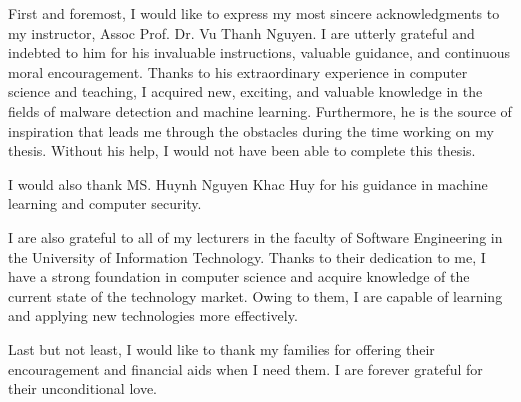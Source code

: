 
\begin{acknowledgements}      

First and foremost, I would like to express my most sincere acknowledgments to my instructor, Assoc Prof. Dr.  Vu Thanh Nguyen. I are utterly grateful and indebted to him for his invaluable instructions, valuable guidance, and continuous moral encouragement. Thanks to his extraordinary experience in computer science and teaching, I acquired new, exciting, and valuable knowledge in the fields of malware detection and machine learning. Furthermore, he is the source of inspiration that leads me through the obstacles during the time working on my thesis. Without his help, I would not have been able to complete this thesis.

I would also thank MS. Huynh Nguyen Khac Huy for his guidance in machine learning and computer security.

I are also grateful to all of my lecturers in the faculty of Software Engineering in the University of Information Technology. Thanks to their dedication to me, I have a strong foundation in computer science and acquire knowledge of the current state of the technology market. Owing to them, I are capable of learning and applying new technologies more effectively.

Last but not least, I would like to thank my families for offering their encouragement and financial aids when I need them. I are forever grateful for their unconditional love. 

\end{acknowledgements}
